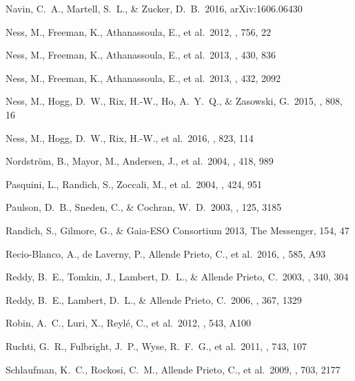 \documentclass[preprint]{aastex}
\begin{document}
\begin{thebibliography}{dummy}
 Navin, C.~A., Martell, S.~L., \& Zucker, D.~B.\ 2016, arXiv:1606.06430 

 Ness, M., Freeman, K., Athanassoula, E., et al.\ 2012, \apj, 756, 22 

 Ness, M., Freeman, K., Athanassoula, E., et al.\ 2013, \mnras, 430, 836 

 Ness, M., Freeman, K., Athanassoula, E., et al.\ 2013, \mnras, 432, 2092 

 Ness, M., Hogg, D.~W., Rix, H.-W., Ho, A.~Y.~Q., \& Zasowski, G.\ 2015, \apj, 808, 16 

 Ness, M., Hogg, D.~W., Rix, H.-W., et al.\ 2016, \apj, 823, 114 

 Nordstr{\"o}m, B., Mayor, M., Andersen, J., et al.\ 2004, \aap, 418, 989 


 Pasquini, L., Randich, S., Zoccali, M., et al.\ 2004, \aap, 424, 951 

 Paulson, D.~B., Sneden, C., \& Cochran, W.~D.\ 2003, \aj, 125, 3185 

 Randich, S., Gilmore, G., \& Gaia-ESO Consortium 2013, The Messenger, 154, 47 

 Recio-Blanco, A., de Laverny, P., Allende Prieto, C., et al.\ 2016, \aap, 585, A93 

 Reddy, B.~E., Tomkin, J., Lambert, D.~L., \& Allende Prieto, C.\ 2003, \mnras, 340, 304 

 Reddy, B.~E., Lambert, D.~L., \& Allende Prieto, C.\ 2006, \mnras, 367, 1329 

 Robin, A.~C., Luri, X., Reyl{\'e}, C., et al.\ 2012, \aap, 543, A100 

 Ruchti, G.~R., Fulbright, J.~P., Wyse, R.~F.~G., et al.\ 2011, \apj, 743, 107 

 Schlaufman, K.~C., Rockosi, C.~M., Allende Prieto, C., et al.\ 2009, \apj, 703, 2177 


\end{thebibliography}
\end{document}
